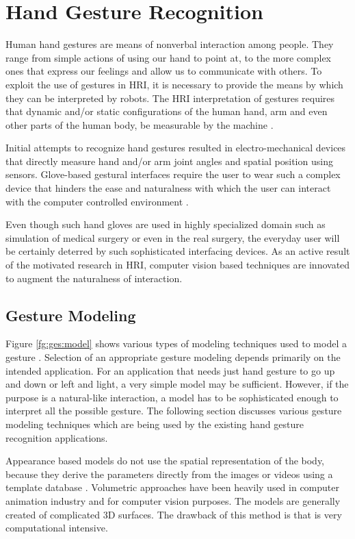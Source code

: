 \section{Hand Gesture Recognition} Human hand gestures are means of nonverbal interaction among people. They range from simple actions of using our hand to point at, to the more complex ones that express our feelings and allow us to communicate with others. To exploit the use of gestures in HRI, it is necessary to provide the means by which they can be interpreted by robots. The HRI interpretation of gestures requires that dynamic and/or static configurations of the human hand, arm and even other parts of the human body, be measurable by the machine \cite{2}. 

Initial attempts to recognize hand gestures resulted in electro-mechanical devices that directly measure hand and/or arm joint angles and spatial position using sensors. Glove-based gestural interfaces require the user to wear such a complex device that hinders the ease and naturalness with which the user can interact with the computer controlled environment \cite{10}. 

Even though such hand gloves are used in highly specialized domain such as simulation of medical surgery or even in the real surgery, the everyday user will be certainly deterred by such sophisticated interfacing devices. As an active result of the motivated research in HRI, computer vision based techniques are innovated to augment the naturalness of interaction.

\subsection{Gesture Modeling} Figure \ref{fg:ges:model} shows various types of modeling techniques used to model a gesture \cite{2}. Selection of an appropriate gesture modeling depends primarily on the intended application. For an application that needs just hand gesture to go up and down or left and light, a very simple model may be sufficient. However, if the purpose is a natural-like interaction, a model has to be sophisticated enough to interpret all the possible gesture. The following section discusses various gesture modeling techniques which are being used by the existing hand gesture recognition applications. 



Appearance based models do not use the spatial representation of the body, because they derive the parameters directly from the images or videos using a template database \cite{2}. Volumetric approaches have been heavily used in computer animation industry and for computer vision purposes. The models are generally created of complicated 3D surfaces. The drawback of this method is that is very computational intensive. 


